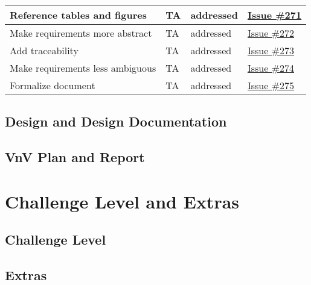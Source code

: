 \documentclass{article}
\begin{document}
\begin{longtable}[H]{|p{5cm}|p{2cm}|p{5cm}|p{3cm}|}
    Reference tables and figures & TA & addressed & \href{https://github.com/ssm-lab/capstone--source-code-optimizer/issues/271}{Issue \#271} \\ \hline
    Make requirements more abstract & TA & addressed & \href{https://github.com/ssm-lab/capstone--source-code-optimizer/issues/272}{Issue \#272} \\ \hline
    Add traceability & TA & addressed & \href{https://github.com/ssm-lab/capstone--source-code-optimizer/issues/273}{Issue \#273} \\ \hline
    Make requirements less ambiguous & TA & addressed & \href{https://github.com/ssm-lab/capstone--source-code-optimizer/issues/274}{Issue \#274} \\ \hline
    Formalize document & TA & addressed & \href{https://github.com/ssm-lab/capstone--source-code-optimizer/issues/275}{Issue \#275} \\ \hline
\end{longtable}

\subsection{Design and Design Documentation}

\subsection{VnV Plan and Report}

\section{Challenge Level and Extras}

\subsection{Challenge Level}


\subsection{Extras}

\end{document}

